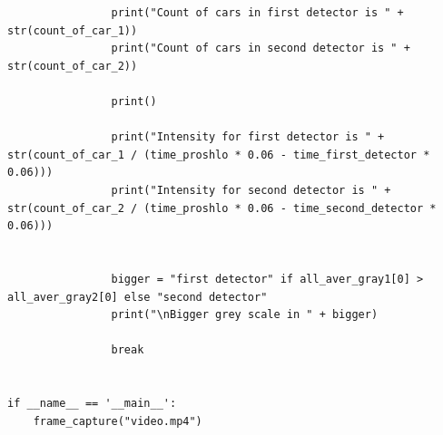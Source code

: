 \documentclass[a4paper,12pt]{article}
\begin{document}
\begin{verbatim}
                print("Count of cars in first detector is " + str(count_of_car_1))
                print("Count of cars in second detector is " + str(count_of_car_2))

                print()

                print("Intensity for first detector is " + str(count_of_car_1 / (time_proshlo * 0.06 - time_first_detector * 0.06)))
                print("Intensity for second detector is " + str(count_of_car_2 / (time_proshlo * 0.06 - time_second_detector * 0.06)))


                bigger = "first detector" if all_aver_gray1[0] > all_aver_gray2[0] else "second detector"
                print("\nBigger grey scale in " + bigger)

                break


if __name__ == '__main__':
    frame_capture("video.mp4")
\end{verbatim}
\end{document}

